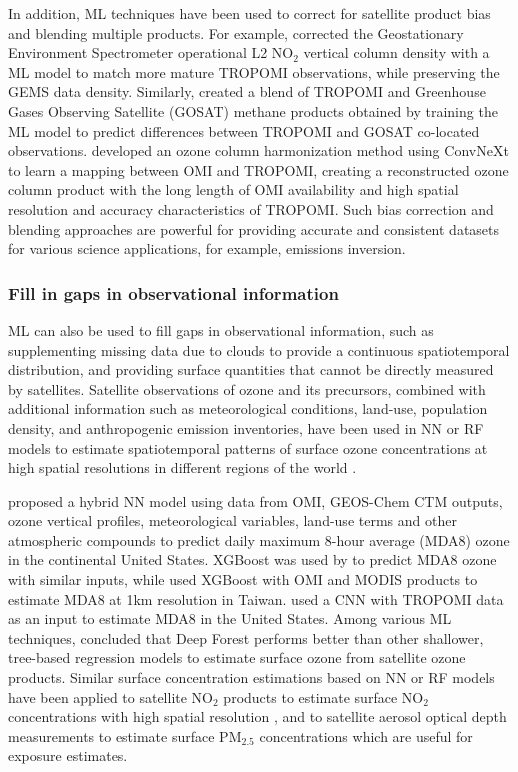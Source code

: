 \documentclass[gmd, manuscript]{copernicus}
\begin{document}
In addition, ML techniques have been used to correct for satellite product bias and blending multiple products. For example, \citet{oak_bias-corrected_2024} corrected the Geostationary Environment Spectrometer operational L2 NO$_2$ vertical column density  with a ML model to match more mature TROPOMI observations, while preserving the GEMS data density. Similarly, \citet{balasus_blended_2023} created a blend of TROPOMI and Greenhouse Gases Observing Satellite (GOSAT) methane products obtained by training the ML model to predict differences between TROPOMI and GOSAT co-located observations. \citet{shi_harmonizing_2024} developed an ozone column harmonization method using ConvNeXt \citep{liu_convnet_2022} to learn a mapping between OMI and TROPOMI, creating a reconstructed ozone column product with the long length of OMI availability and high spatial resolution and accuracy characteristics of TROPOMI. Such bias correction and blending approaches are powerful for providing accurate and consistent datasets for various science applications, for example, emissions inversion. 

\subsubsection{Fill in gaps in observational information }

ML can also be used to fill gaps in observational information, such as supplementing missing data due to clouds to provide a continuous spatiotemporal distribution, and providing surface quantities that cannot be directly measured by satellites. Satellite observations of ozone and its precursors, combined with additional information such as meteorological conditions, land-use, population density, and anthropogenic emission inventories, have been used in NN or RF models to estimate spatiotemporal patterns of surface ozone concentrations at high spatial resolutions in different regions of the world \citep{di_hybrid_2017, wang_machine_2022, zhu_combining_2022, kang_estimation_2021, ghahremanloo_deep_2023}.

\citet{di_hybrid_2017} proposed a hybrid NN model using data from OMI, GEOS-Chem CTM outputs, ozone vertical profiles, meteorological variables, land-use terms and other atmospheric compounds to predict
daily maximum 8-hour average (MDA8) ozone in the continental United States. XGBoost was used by \citet{liu_spatiotemporal_2020} to predict MDA8 ozone with similar inputs, while \citet{jung_machine_2024} used XGBoost with OMI and MODIS products to estimate MDA8 at 1km resolution in Taiwan. \citet{ghahremanloo_deep_2023} used a CNN with TROPOMI data as an input to estimate MDA8 in the United States. Among various ML techniques, \citet{zong_deep_2024} concluded that Deep Forest performs better than other shallower, tree-based regression models to estimate surface ozone from satellite ozone products. Similar surface concentration estimations based on NN or RF models have been applied to satellite NO$_2$ products to estimate surface NO$_2$ concentrations with high spatial resolution \citep{kim_importance_2021}, and to satellite aerosol optical depth measurements to estimate surface PM$_{2.5}$ concentrations \citep{huang_high-resolution_2021, xiao_evaluation_2021} which are useful for exposure estimates.
\end{document}
